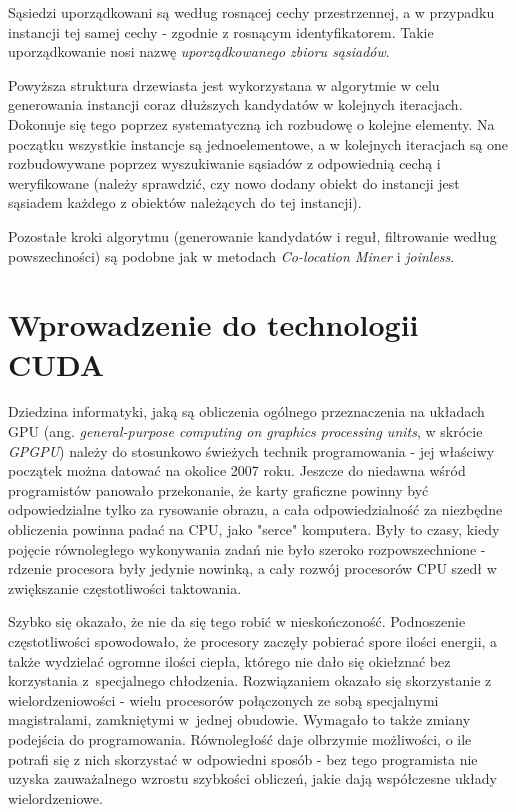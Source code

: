 \documentclass[12pt]{article}
\begin{document}
Sąsiedzi uporządkowani są według rosnącej cechy przestrzennej, a w przypadku instancji tej samej cechy - zgodnie z rosnącym identyfikatorem. Takie uporządkowanie nosi nazwę \textit{uporządkowanego zbioru sąsiadów}.

Powyższa struktura drzewiasta jest wykorzystana w algorytmie w celu generowania instancji coraz dłuższych kandydatów w kolejnych iteracjach. Dokonuje się tego poprzez systematyczną ich rozbudowę o kolejne elementy. Na początku wszystkie instancje są jednoelementowe, a w kolejnych iteracjach są one rozbudowywane poprzez wyszukiwanie sąsiadów z odpowiednią cechą i weryfikowane (należy sprawdzić, czy nowo dodany obiekt do instancji jest sąsiadem każdego z obiektów należących do tej instancji). 

Pozostałe kroki algorytmu (generowanie kandydatów i reguł, filtrowanie według powszechności) są podobne jak w metodach \textit{Co-location Miner} i \textit{joinless}.

\newpage

\section{Wprowadzenie do technologii CUDA}
\label{sec:cuda}

Dziedzina informatyki, jaką są obliczenia ogólnego przeznaczenia na układach GPU (ang. \textit{general-purpose computing on graphics processing units}, w skrócie \textit{GPGPU}) należy do stosunkowo świeżych technik programowania - jej właściwy początek można datować na okolice 2007 roku. Jeszcze do niedawna wśród programistów panowało przekonanie, że karty graficzne powinny być odpowiedzialne tylko za rysowanie obrazu, a cała odpowiedzialność za niezbędne obliczenia powinna padać na CPU, jako "serce" komputera. Były to czasy, kiedy pojęcie równoległego wykonywania zadań nie było szeroko rozpowszechnione - rdzenie procesora były jedynie nowinką, a cały rozwój procesorów CPU szedł w zwiększanie częstotliwości taktowania.

Szybko się okazało, że nie da się tego robić w nieskończoność. Podnoszenie częstotliwości spowodowało, że procesory zaczęły pobierać spore ilości energii, a także wydzielać ogromne ilości ciepła, którego nie dało się okiełznać bez korzystania z~specjalnego chłodzenia. Rozwiązaniem okazało się skorzystanie z wielordzeniowości - wielu procesorów połączonych ze sobą specjalnymi magistralami, zamkniętymi w~jednej obudowie. Wymagało to także zmiany podejścia do programowania. Równoległość daje olbrzymie możliwości, o ile potrafi się z nich skorzystać w odpowiedni sposób - bez tego programista nie uzyska zauważalnego wzrostu szybkości obliczeń, jakie dają współczesne układy wielordzeniowe. 
\end{document}
